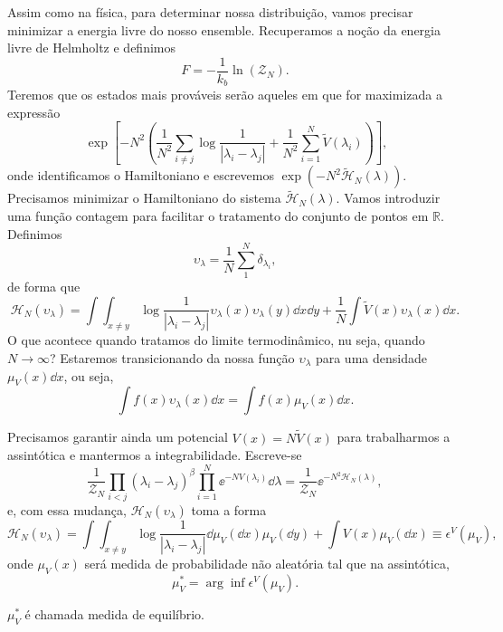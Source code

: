 Assim como na física, para determinar nossa distribuição, vamos precisar minimizar a energia livre do nosso ensemble. Recuperamos a noção da energia livre de Helmholtz e definimos
\[
F = -\frac{1}{k_b} \ln{(\mathcal{Z}_N)}.
\]
Teremos que os estados mais prováveis serão aqueles em que for maximizada a expressão
\begin{equation}\
	\exp{\left[-N^2 \left( \frac{1}{N^2}\sum_{i\neq j}\log{\frac{1}{|\lambda_i - \lambda_j|}} + \frac{1}{N^2} \sum_{i=1}^{N} \tilde{V}(\lambda_i)  \right)\right]},
\end{equation}
onde identificamos o Hamiltoniano e escrevemos $\exp{(-N^2\mathcal{\tilde{H}}_N(\lambda))}$. Precisamos minimizar o Hamiltoniano do sistema $\mathcal{\tilde{H}}_N(\lambda)$. Vamos introduzir uma função contagem para facilitar o tratamento do conjunto de pontos em $\mathbb{R}$. Definimos
\begin{equation}
	\upsilon_\lambda = \frac{1}{N} \sum_1^N \delta_{\lambda_i},
\end{equation}
de forma que
\begin{equation}
	\mathcal{H}_N(\upsilon_\lambda) = 	\int \int_{x\neq y} \log{\frac{1}{|\lambda_i - \lambda_j|}}  \upsilon_\lambda(x) \upsilon_\lambda(y) \dd x \dd y + \frac{1}{N} \int \tilde{V}(x) \upsilon_\lambda(x) \dd x.
	\label{eq::CoulombGas:: hamilton}
\end{equation}
O que acontece quando tratamos do limite termodinâmico, nu seja, quando $N\to\infty$? Estaremos transicionando da nossa função $\upsilon_\lambda$ para uma densidade $\mu_V(x) \dd x$, ou seja,
\[
\int f(x) \upsilon_\lambda(x) \dd x =  \int f(x) \mu_V(x) \dd x.
\]

Precisamos garantir ainda um potencial $V(x) = 
N\tilde{V}(x)$ para trabalharmos a assintótica e mantermos a integrabilidade. Escreve-se
\[
\frac{1}{\mathcal{Z}_N} \prod_{i<j} (\lambda_i - \lambda_j)^\beta \prod_{i=1}^{N} \ee^{-NV(\lambda_i)} \dd\lambda = 	\frac{1}{\mathcal{Z}_N}  \ee^{-N^2 \mathcal{H}_N(\lambda)},
\]
e, com essa mudança, $\mathcal{H}_N(\upsilon_\lambda)$ toma a forma
\begin{equation}
	\mathcal{H}_N(\upsilon_\lambda) = \int \int_{x\neq y} \log{\frac{1}{|\lambda_i - \lambda_j|}}  \dd\mu_V(\dd x) \mu_V(\dd y) + \int V(x) \mu_V(\dd x) \equiv \epsilon^V(\mu_V),
\end{equation}
onde $\mu_V(x)$ será medida de probabilidade não aleatória tal que na assintótica,
\[
\mu_V^* = \arg \inf {\epsilon^V(\mu_V)}.
\]

$\mu_V^*$ é chamada medida de equilíbrio.
